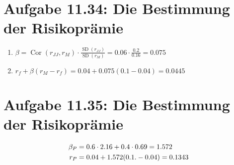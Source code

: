 \documentclass{article}
\DeclareMathOperator{\SD}{SD}
\DeclareMathOperator{\Cor}{Cor}
\begin{document}
	\section*{Aufgabe 11.34: Die Bestimmung der Risikoprämie}
	\begin{enumerate}[label=(\alph*)]
		\item $\beta = \Cor(r_{JJ},r_M)\cdot\frac{\SD(r_{JJ})}{\SD(r_M)}=0.06\cdot\frac{0.2}{0.16}=0.075$
		\item $r_f+\beta(r_M-r_f)=0.04+0.075(0.1-0.04)=0.0445$
	\end{enumerate}
	
	\section*{Aufgabe 11.35: Die Bestimmung der Risikoprämie}
	\begin{align}
		\beta_P &= 0.6\cdot 2.16 + 0.4\cdot 0.69 = 1.572 \notag \\
		r_P &= 0.04 + 1.572(0.1.-0.04) = 0.1343 \notag
	\end{align}
	
\end{document}
